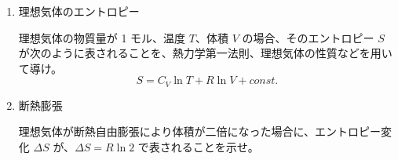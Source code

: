 \documentclass[uplatex,dvipdfmx,a4paper,11pt]{jsarticle}
\newcommand{\diff}{\mathrm d}
\newcommand{\difp}[2]{\dfrac{\partial #1}{\partial #2}}
\begin{document}
\begin{enumerate}
\begin{enumerate}
%
%

\item
理想気体のエントロピー

理想気体の物質量が 1 モル、温度 $T$、体積 $V$ の場合、そのエントロピー $S$ が次のように表されることを、熱力学第一法則、理想気体の性質などを用いて導け。
\[S = C_V \ln T + R \ln V + const. \]

%
%
%

\item
断熱膨張

理想気体が断熱自由膨張により体積が二倍になった場合に、エントロピー変化 $\Delta S$ が、$\Delta S = R \ln 2$ で表されることを示せ。


\end{enumerate}
\end{enumerate}
\end{document}
